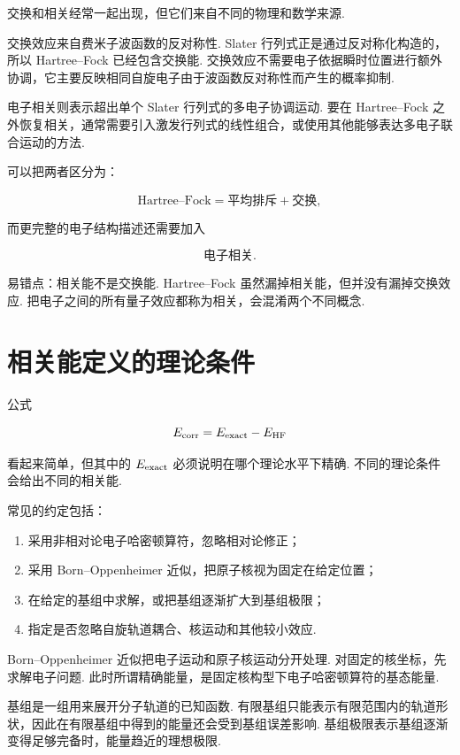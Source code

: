 \documentclass[UTF8,11pt,a4paper,openany]{ctexbook}
\begin{document}
交换和相关经常一起出现，但它们来自不同的物理和数学来源. 

交换效应来自费米子波函数的反对称性. Slater 行列式正是通过反对称化构造的，所以 Hartree--Fock 已经包含交换能. 交换效应不需要电子依据瞬时位置进行额外协调，它主要反映相同自旋电子由于波函数反对称性而产生的概率抑制. 

电子相关则表示超出单个 Slater 行列式的多电子协调运动. 要在 Hartree--Fock 之外恢复相关，通常需要引入激发行列式的线性组合，或使用其他能够表达多电子联合运动的方法. 

可以把两者区分为：

\[
\text{Hartree--Fock}
=
\text{平均排斥}
+
\text{交换},
\]

而更完整的电子结构描述还需要加入

\[
\text{电子相关}.
\]

\begin{limitbox}
易错点：相关能不是交换能.  Hartree--Fock 虽然漏掉相关能，但并没有漏掉交换效应. 把电子之间的所有量子效应都称为相关，会混淆两个不同概念. 
\end{limitbox}

\section{相关能定义的理论条件}

公式

\[
E_{\rm corr}=E_{\rm exact}-E_{\rm HF}
\]

看起来简单，但其中的 $E_{\rm exact}$ 必须说明在哪个理论水平下精确. 不同的理论条件会给出不同的相关能. 

常见的约定包括：

\begin{enumerate}
\item 采用非相对论电子哈密顿算符，忽略相对论修正；
\item 采用 Born--Oppenheimer 近似，把原子核视为固定在给定位置；
\item 在给定的基组中求解，或把基组逐渐扩大到基组极限；
\item 指定是否忽略自旋轨道耦合、核运动和其他较小效应. 
\end{enumerate}

Born--Oppenheimer 近似把电子运动和原子核运动分开处理. 对固定的核坐标，先求解电子问题. 此时所谓精确能量，是固定核构型下电子哈密顿算符的基态能量. 

\begin{notationbox}
基组是一组用来展开分子轨道的已知函数. 有限基组只能表示有限范围内的轨道形状，因此在有限基组中得到的能量还会受到基组误差影响. 基组极限表示基组逐渐变得足够完备时，能量趋近的理想极限. 
\end{notationbox}
\end{document}
